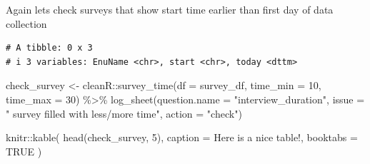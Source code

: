 \documentclass[
  letterpaper,
  DIV=11,
  numbers=noendperiod]{scrreprt}
\newenvironment{Shaded}{\begin{snugshade}}{\end{snugshade}}
\newcommand{\AttributeTok}[1]{\textcolor[rgb]{0.40,0.45,0.13}{#1}}
\newcommand{\ConstantTok}[1]{\textcolor[rgb]{0.56,0.35,0.01}{#1}}
\newcommand{\DecValTok}[1]{\textcolor[rgb]{0.68,0.00,0.00}{#1}}
\newcommand{\FunctionTok}[1]{\textcolor[rgb]{0.28,0.35,0.67}{#1}}
\newcommand{\NormalTok}[1]{\textcolor[rgb]{0.00,0.23,0.31}{#1}}
\newcommand{\OtherTok}[1]{\textcolor[rgb]{0.00,0.23,0.31}{#1}}
\newcommand{\SpecialCharTok}[1]{\textcolor[rgb]{0.37,0.37,0.37}{#1}}
\newcommand{\StringTok}[1]{\textcolor[rgb]{0.13,0.47,0.30}{#1}}
\begin{document}
Again lets check surveys that show start time earlier than first day of
data collection

\begin{Shaded}
\end{Shaded}

\begin{verbatim}
# A tibble: 0 x 3
# i 3 variables: EnuName <chr>, start <chr>, today <dttm>
\end{verbatim}

\begin{Shaded}
\begin{Highlighting}[]
\NormalTok{check\_survey }\OtherTok{\textless{}{-}}\NormalTok{ cleanR}\SpecialCharTok{::}\FunctionTok{survey\_time}\NormalTok{(}\AttributeTok{df =}\NormalTok{ survey\_df, }\AttributeTok{time\_min =} \DecValTok{10}\NormalTok{, }\AttributeTok{time\_max =} \DecValTok{30}\NormalTok{) }\SpecialCharTok{\%\textgreater{}\%} 
  \FunctionTok{log\_sheet}\NormalTok{(}\AttributeTok{question.name =} \StringTok{"interview\_duration"}\NormalTok{,}
            \AttributeTok{issue =} \StringTok{" survey filled with less/more time"}\NormalTok{,}
            \AttributeTok{action =} \StringTok{"check"}\NormalTok{)}
\end{Highlighting}
\end{Shaded}

\begin{Shaded}
\begin{Highlighting}[]
\NormalTok{knitr}\SpecialCharTok{::}\FunctionTok{kable}\NormalTok{(}
  \FunctionTok{head}\NormalTok{(check\_survey, }\DecValTok{5}\NormalTok{), }\AttributeTok{caption =} \StringTok{\textquotesingle{}Here is a nice table!\textquotesingle{}}\NormalTok{,}
  \AttributeTok{booktabs =} \ConstantTok{TRUE}
\NormalTok{)}
\end{Highlighting}
\end{Shaded}
\end{document}
